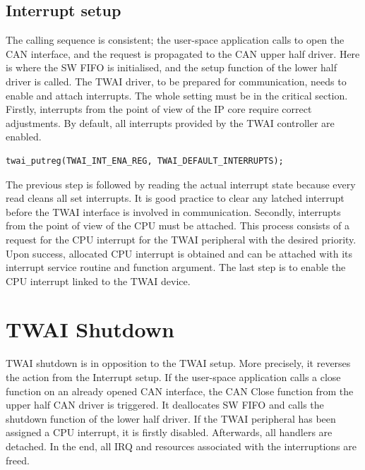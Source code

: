 \documentclass{ctuthesis}
\begin{document}
 \subsection{Interrupt setup}
 The calling sequence is consistent; the user-space application calls to open the CAN interface, and the request is propagated to the CAN upper half driver. Here is where the SW FIFO is initialised, and the setup function of the lower half driver is called. The TWAI driver, to be prepared for communication, needs to enable and attach interrupts. The whole setting must be in the critical section. Firstly, interrupts from the point of view of the IP core require correct adjustments. By default, all interrupts provided by the TWAI controller are enabled.
\begin{verbatim}
twai_putreg(TWAI_INT_ENA_REG, TWAI_DEFAULT_INTERRUPTS);
\end{verbatim}
 The previous step is followed by reading the actual interrupt state because every read cleans all set interrupts. It is good practice to clear any latched interrupt before the TWAI interface is involved in communication.
 Secondly, interrupts from the point of view of the CPU must be attached. This process consists of a request for the CPU interrupt for the TWAI peripheral with the desired priority. Upon success, allocated CPU interrupt is obtained and can be attached with its interrupt service routine and function argument. The last step is to enable the CPU interrupt linked to the TWAI device.

 
 \section{TWAI Shutdown}
 TWAI shutdown is in opposition to the TWAI setup. More precisely, it reverses the action from the Interrupt setup. If the user-space application calls a close function on an already opened CAN interface, the CAN Close function from the upper half CAN driver is triggered. It deallocates SW FIFO and calls the shutdown function of the lower half driver. If the TWAI peripheral has been assigned a CPU interrupt, it is firstly disabled. Afterwards, all handlers are detached. In the end, all IRQ and resources associated with the interruptions are freed.
 
\end{document}
